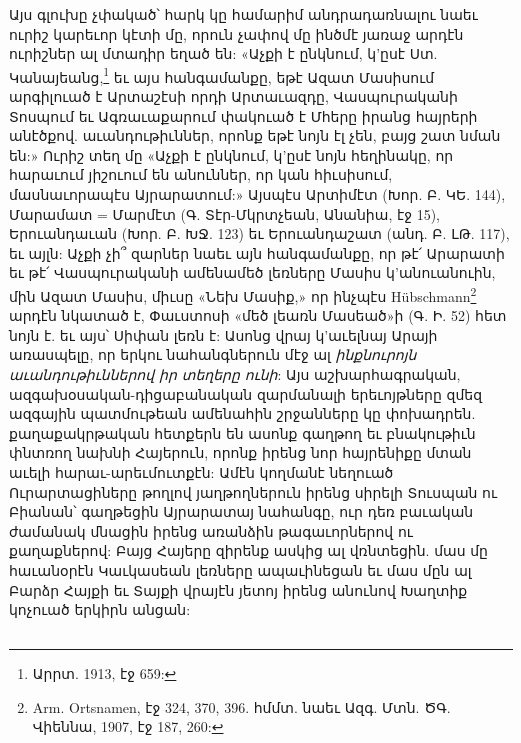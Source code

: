 \documentclass{article}
\begin{document}
{Այս գլուխը չփակած՝ հարկ կը համարիմ անդրադառնալու նաեւ ուրիշ կարեւոր կէտի մը, որուն չափով մը ինծմէ յառաջ արդէն ուրիշներ ալ մտադիր եղած են: «Աչքի է ընկնում, կ'ըսէ Ստ. Կանայեանց,\footnote{Արրտ. 1913, էջ 659:} եւ այս հանգամանքը, եթէ Ազատ Մասիսում արգիլուած է Արտաշէսի որդի Արտաւազդը, Վասպուրականի Տոսպում եւ Ագռաւաքարում փակուած է Մհերը իրանց հայրերի անէծքով. աւանդութիւններ, որոնք եթէ նոյն էլ չեն, բայց շատ նման են:» Ուրիշ տեղ մը «Աչքի է ընկնում, կ'ըսէ նոյն հեղինակը, որ հարաւում յիշուում են անուններ, որ կան հիւսիսում, մասնաւորապէս Այրարատում:» Այսպէս Արտիմէտ (Խոր. Բ. ԿԵ. 144), Մարամատ = Մարմէտ (Գ. Տէր-Մկրտչեան, Անանիա, էջ 15), Երուանդաւան (Խոր. Բ. ԽՋ. 123) եւ Երուանդաշատ (անդ. Բ. ԼԹ. 117), եւ այլն: Աչքի չի՞ զարներ նաեւ այն հանգամանքը, որ թէ՛ Արարատի եւ թէ՛ Վասպուրականի ամենամեծ լեռները Մասիս կ'անուանուին, մին Ազատ Մասիս, միւսը «Նեխ Մասիք,» որ ինչպէս Hübschmann\footnote{Arm. Ortsnamen, էջ 324, 370, 396. հմմտ. նաեւ Ազգ. Մտն. ԾԳ. Վիեննա, 1907, էջ 187, 260:} արդէն նկատած է, Փաւստոսի «մեծ լեառն Մասեած»ի (Գ. Ի. 52) հետ նոյն է. եւ այս՝ Սիփան լեռն է: Ասոնց վրայ կ'աւելնայ Արայի առասպելը, որ երկու նահանգներուն մէջ ալ \emph{ինքնուրոյն աւանդութիւններով իր տեղերը ունի}: Այս աշխարհագրական, ազգախօսական-դիցաբանական զարմանալի երեւոյթները զմեզ ազգային պատմութեան ամենահին շրջանները կը փոխադրեն. քաղաքակրթական հետքերն են ասոնք գաղթող եւ բնակութիւն փնտռող նախնի Հայերուն, որոնք իրենց նոր հայրենիքը մտան աւելի հարաւ-արեւմուտքէն: Ամէն կողմանէ նեղուած Ուրարտացիները թողլով յաղթողներուն իրենց սիրելի Տուսպան ու Բիանան՝ գաղթեցին Այրարատայ նահանգը, ուր դեռ բաւական ժամանակ մնացին իրենց առանձին թագաւորներով ու քաղաքներով: Բայց Հայերը զիրենք ասկից ալ վռնտեցին. մաս մը հաւանօրէն Կաւկասեան լեռները ապաւինեցան եւ մաս մըն ալ Բարձր Հայքի եւ Տայքի վրայէն յետոյ իրենց անունով Խաղտիք կոչուած երկիրն անցան:}
\clearpage
\subsection{}
\end{document}
